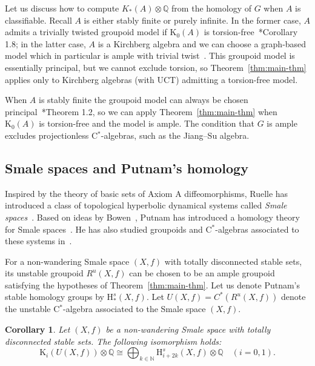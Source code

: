 \documentclass[a4paper,reqno]{amsart}
\theoremstyle{plain}
\newtheorem{corollary}[theorem]{Corollary}
\theoremstyle{definition}
\theoremstyle{remark}
\numberwithin{equation}{section}
\newcommand{\rH}{\mathrm{H}}
\newcommand{\rK}{\mathrm{K}}
\newcommand{\dN}{\mathbb{N}}
\newcommand{\dQ}{\mathbb{Q}}
\begin{document}
\smallskip

Let us discuss how to compute $K_*(A)\otimes \dQ$ from the homology of $G$ when $A$ is classifiable. Recall $A$ is either stably finite or purely infinite. In the former case, $A$ admits a trivially twisted groupoid model if $\rK_0(A)$ is torsion-free~\cite{li:diag}*{Corollary 1.8}; in the latter case, $A$ is a Kirchberg algebra and we can choose a graph-based model which in particular is ample with trivial twist~\cites{cfh:kirchample,spiel:kirchgraph}.
This groupoid model is essentially principal, but we cannot exclude torsion, so Theorem~\ref{thm:main-thm} applies only to Kirchberg algebras (with UCT) admitting a torsion-free model. 

When $A$ is stably finite the groupoid model can always be chosen principal~\cite{li:diag}*{Theorem 1.2}, so we can apply Theorem~\ref{thm:main-thm} when $\rK_0(A)$ is torsion-free and the model is ample. The condition that $G$ is ample excludes projectionless C$^*$-algebras, such as the Jiang--Su algebra.

\subsection{Smale spaces and Putnam's homology}%

Inspired by the theory of basic sets of Axiom A diffeomorphisms, Ruelle has introduced a class of topological hyperbolic dynamical systems called \emph{Smale spaces}~\cite{ruelle:thermo}. Based on ideas by Bowen~\cite{bow:mA}, Putnam has introduced a homology theory for Smale spaces~\cite{put:HoSmale}. He has also studied groupoids and C$^*$-algebras associated to these systems in~\cites{put:algSmale,put:funct}.

For a non-wandering Smale space $(X,f)$ with totally disconnected stable sets, its unstable groupoid $R^u(X,f)$ can be chosen to be an ample groupoid satisfying the hypotheses of Theorem~\ref{thm:main-thm}. Let us denote Putnam's stable homology groups by $\rH^s_*(X,f)$. Let $U(X,f)=C^*(R^u(X,f))$ denote the unstable C$^*$-algebra associated to the Smale space $(X,f)$. 

\begin{corollary}\label{cor:hk-iso-smale}
Let $(X,f)$ be a non-wandering Smale space with totally disconnected stable sets. The following isomorphism holds:
\[
\rK_i(U(X,f))\otimes \dQ \cong \bigoplus_{k\in \dN} \rH^s_{i+2k}(X,f)\otimes \dQ \quad (i = 0, 1).
\]
\end{corollary}
\end{document}
